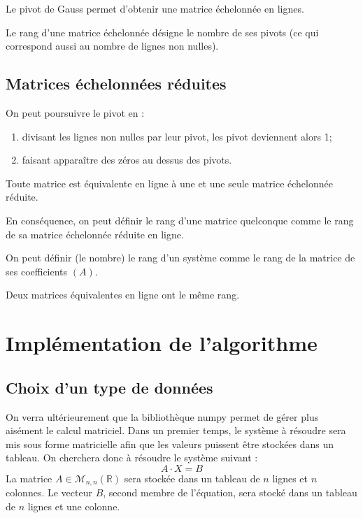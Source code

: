 \documentclass[10pt]{article}
\begin{document}
\begin{prop}
Le pivot de Gauss permet d'obtenir une matrice échelonnée en lignes. 
\end{prop}

\begin{defi}
Le rang d'une matrice échelonnée désigne le nombre de ses pivots (ce qui correspond aussi au nombre de lignes non nulles). 
\end{defi}

\subsection{Matrices échelonnées réduites}
On peut poursuivre le pivot en : 
\begin{enumerate}
\item divisant les lignes non nulles par leur pivot, les pivot deviennent alors 1;
\item faisant apparaître des zéros au dessus des pivots. 
\end{enumerate}

\begin{prop}
Toute matrice est équivalente en ligne à une et une seule matrice échelonnée réduite. 

En conséquence, on peut définir le rang d'une matrice quelconque comme le rang de sa matrice échelonnée réduite en ligne. 

On peut définir (le nombre) le rang d'un système comme le rang de la matrice de ses coefficients $(A)$. 
\end{prop}

\begin{rem}
Deux matrices équivalentes en ligne ont le même rang. 
\end{rem}

\section{Implémentation de l'algorithme}

\subsection{Choix d'un type de données}
On verra ultérieurement que la bibliothèque numpy permet de gérer plus aisément le calcul matriciel. Dans un premier temps, le système à résoudre sera mis sous forme matricielle afin que les valeurs puissent être stockées dans un tableau. 
On cherchera donc à résoudre le système suivant :
$$
A\cdot X = B
$$
La matrice $A\in\mathcal{M}_{n,n}(\mathbb{R})$ sera stockée dans un tableau de $n$ lignes et $n$ colonnes. Le vecteur $B$, second membre de l'équation, sera stocké dans un tableau de $n$ lignes et une colonne. 
\end{document}
